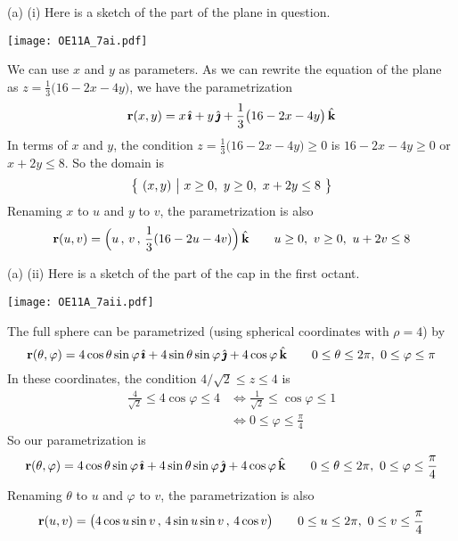 \begin{solution} 
(a) (i) Here is a sketch of the part of the plane in question.
\begin{center}
    \texttt{[image: OE11A\_7ai.pdf]}
\end{center}
We can use $x$ and $y$ as parameters. As we can rewrite the equation of the
plane as $z = \frac{1}{3}\big(16-2x-4y\big)$, we have
the parametrization
\begin{equation*}
\mathbf{r}(x,y) = x\,\hat{\pmb{\imath}} +y\,\hat{\pmb{\jmath}} +\frac{1}{3}\big(16-2x-4y\big)\,\hat{\mathbf{k}}
\end{equation*}
In terms of $x$ and $y$, the condition $z= \frac{1}{3}\big(16-2x-4y\big)\ge 0$
is $16-2x-4y\ge 0$ or $x+2y\le 8$. So the domain is
\begin{equation*}
\big\{ \ (x,y)\ \big|\ x\ge 0,\ y\ge 0,\ x+2y\le 8\ \big\}
\end{equation*}
Renaming $x$ to $u$ and $y$ to $v$, the parametrization is also
\begin{equation*}
\mathbf{r}(u,v) = \Big(u\,,\, v\,,\, \frac{1}{3}(16-2u-4v)\Big)\,\hat{\mathbf{k}}\qquad
u\ge 0,\ v\ge 0,\ u+2v\le 8
\end{equation*}

(a) (ii) Here is a sketch of the part of the cap in the first octant.
\begin{center}
    \texttt{[image: OE11A\_7aii.pdf]}
\end{center}
The full sphere can be parametrized (using spherical coordinates with
$\rho=4$) by
\begin{equation*}
\mathbf{r}(\theta,\varphi) = 4\cos\theta\sin\varphi\,\hat{\pmb{\imath}}
                     +4\sin\theta\sin\varphi\,\hat{\pmb{\jmath}}
                     +4\cos\varphi\,\hat{\mathbf{k}}\qquad
0\le\theta\le 2\pi,\ 0\le\varphi\le \pi
\end{equation*}
In these coordinates, the condition  $4/\sqrt{2} \le z \le 4$ is
\begin{align*}
\frac{4}{\sqrt{2}} \le 4\cos\varphi \le 4
&\iff \frac{1}{\sqrt{2}} \le \cos\varphi \le 1 \\
&\iff 0\le\varphi\le\frac{\pi}{4}
\end{align*}
So our parametrization is
\begin{equation*}
\mathbf{r}(\theta,\varphi) = 4\cos\theta\sin\varphi\,\hat{\pmb{\imath}}
                     +4\sin\theta\sin\varphi\,\hat{\pmb{\jmath}}
                     +4\cos\varphi\,\hat{\mathbf{k}}\qquad
0\le\theta\le 2\pi,\ 0\le\varphi\le \frac{\pi}{4}
\end{equation*}
Renaming $\theta$ to $u$ and $\varphi$ to $v$, the parametrization is also
\begin{equation*}
\mathbf{r}(u,v) = \big(4\cos u\sin v\,,\,
                     4\sin u\sin v\,,\,
                     4\cos v\big)\qquad
0\le u\le 2\pi,\ 0\le v\le \frac{\pi}{4}
\end{equation*}


\end{solution}
